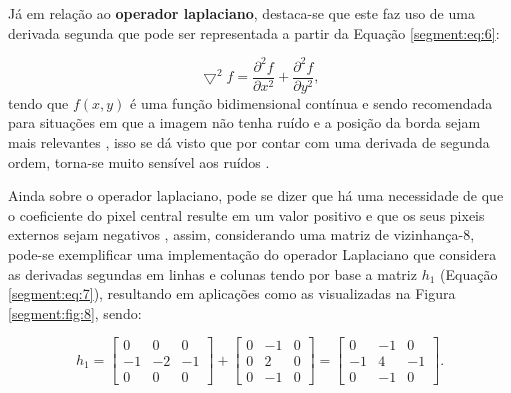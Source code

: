 Já em relação ao \textbf{operador laplaciano}, destaca-se que este faz uso de uma derivada segunda que pode ser representada a partir da Equação \ref{segment:eq:6}:

\begin{equation}
    \label{segment:eq:6}
    \bigtriangledown^2 f = \frac{\partial^2f}{\partial x^2} + \frac{\partial^2f}{\partial y^2},
\end{equation}
tendo que $f(x,y)$ é uma função bidimensional contínua e sendo recomendada para situações em que a imagem não tenha ruído e a posição da borda sejam mais relevantes \cite{Yuheng2017}, isso se dá visto que por contar com uma derivada de segunda ordem, torna-se muito sensível aos ruídos \cite{pedrini2008analise}.

Ainda sobre o operador laplaciano, pode se dizer que há uma necessidade de que o coeficiente do pixel central resulte em um valor positivo e que os seus pixeis externos sejam negativos \cite{pedrini2008analise}, assim, considerando uma matriz de vizinhança-8, pode-se exemplificar uma implementação do operador Laplaciano que considera as derivadas segundas em linhas e colunas tendo por base a matriz $h_1$ (Equação \ref{segment:eq:7}), resultando em aplicações como as visualizadas na Figura \ref{segment:fig:8}, sendo: 

\begin{equation}
    \label{segment:eq:7}
    h_1 = \begin{bmatrix}
     0 &  0 &  0 \\ 
    -1 & -2 & -1 \\ 
     0 &  0 &  0
    \end{bmatrix} +
    \begin{bmatrix}
     0 & -1 & 0 \\ 
     0 &  2 & 0 \\ 
     0 & -1 & 0 
    \end{bmatrix} =
    \begin{bmatrix}
     0 & -1 & 0 \\ 
    -1 &  4 & -1 \\ 
     0 & -1 & 0 
    \end{bmatrix}.
\end{equation}

